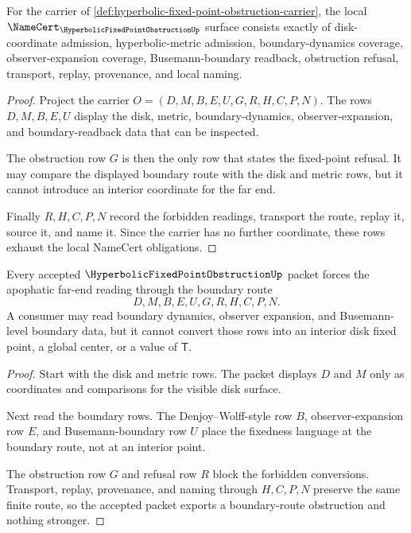 \begin{theorem}
\label{thm:hyperbolic-fixed-point-obstruction-namecert-obligations}
For the carrier of \autoref{def:hyperbolic-fixed-point-obstruction-carrier}, the local $\NameCert_{\HyperbolicFixedPointObstructionUp}$ surface consists exactly of disk-coordinate admission, hyperbolic-metric admission, boundary-dynamics coverage, observer-expansion coverage, Busemann-boundary readback, obstruction refusal, transport, replay, provenance, and local naming.
\end{theorem}
\begin{proof}
Project the carrier $O=(D,M,B,E,U,G,R,H,C,P,N)$. The rows $D,M,B,E,U$ display the disk, metric, boundary-dynamics, observer-expansion, and boundary-readback data that can be inspected.

The obstruction row $G$ is then the only row that states the fixed-point refusal. It may compare the displayed boundary route with the disk and metric rows, but it cannot introduce an interior coordinate for the far end.

Finally $R,H,C,P,N$ record the forbidden readings, transport the route, replay it, source it, and name it. Since the carrier has no further coordinate, these rows exhaust the local NameCert obligations.
\end{proof}

\begin{theorem}
\label{thm:hyperbolic-fixed-point-boundary-route-obstruction}
Every accepted $\HyperbolicFixedPointObstructionUp$ packet forces the apophatic far-end reading through the boundary route
$$
D,M,B,E,U,G,R,H,C,P,N .
$$
A consumer may read boundary dynamics, observer expansion, and Busemann-level boundary data, but it cannot convert those rows into an interior disk fixed point, a global center, or a value of $\mathsf{T}$.
\end{theorem}
\begin{proof}
Start with the disk and metric rows. The packet displays $D$ and $M$ only as coordinates and comparisons for the visible disk surface.

Next read the boundary rows. The Denjoy--Wolff-style row $B$, observer-expansion row $E$, and Busemann-boundary row $U$ place the fixedness language at the boundary route, not at an interior point.

The obstruction row $G$ and refusal row $R$ block the forbidden conversions. Transport, replay, provenance, and naming through $H,C,P,N$ preserve the same finite route, so the accepted packet exports a boundary-route obstruction and nothing stronger.
\end{proof}

